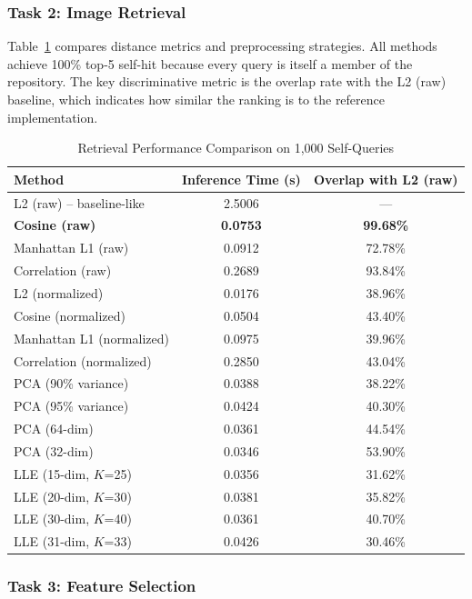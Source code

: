 \documentclass[onecolumn,a4paper,12pt]{IEEEtran}
\begin{document}
\subsubsection{Task 2: Image Retrieval}

Table~\ref{tab:task2} compares distance metrics and preprocessing strategies. All methods achieve 100\% top-5 self-hit because every query is itself a member of the repository. The key discriminative metric is the overlap rate with the L2 (raw) baseline, which indicates how similar the ranking is to the reference implementation.

\begin{table}[htbp]
\centering
\caption{Retrieval Performance Comparison on 1,000 Self-Queries}
\label{tab:task2}
\begin{tabular}{lcc}
\toprule
\textbf{Method} & \textbf{Inference Time (s)} & \textbf{Overlap with L2 (raw)} \\
\midrule
L2 (raw) -- baseline-like & 2.5006 & --- \\
\textbf{Cosine (raw)} & \textbf{0.0753} & \textbf{99.68\%} \\
Manhattan L1 (raw) & 0.0912 & 72.78\% \\
Correlation (raw) & 0.2689 & 93.84\% \\
L2 (normalized) & 0.0176 & 38.96\% \\
Cosine (normalized) & 0.0504 & 43.40\% \\
Manhattan L1 (normalized) & 0.0975 & 39.96\% \\
Correlation (normalized) & 0.2850 & 43.04\% \\
\midrule
PCA (90\% variance) & 0.0388 & 38.22\% \\
PCA (95\% variance) & 0.0424 & 40.30\% \\
PCA (64-dim) & 0.0361 & 44.54\% \\
PCA (32-dim) & 0.0346 & 53.90\% \\
\midrule
LLE (15-dim, $K$=25) & 0.0356 & 31.62\% \\
LLE (20-dim, $K$=30) & 0.0381 & 35.82\% \\
LLE (30-dim, $K$=40) & 0.0361 & 40.70\% \\
LLE (31-dim, $K$=33) & 0.0426 & 30.46\% \\
\bottomrule
\end{tabular}
\end{table}

\subsubsection{Task 3: Feature Selection}
\end{document}
